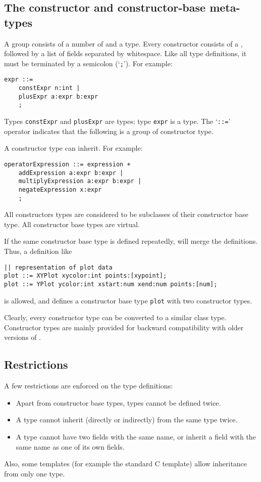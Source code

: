 \subsection{The constructor and constructor-base meta-types}
A  group consists of a number of 
and a  type.
Every constructor consists of a , followed by a 
list of fields separated by whitespace.
Like all type definitions, it must be terminated by a semicolon (`\verb';'').
For example:
\begin{verbatim}
expr ::=
    constExpr n:int |
    plusExpr a:expr b:expr
    ;
\end{verbatim}
Types {\tt constExpr} and {\tt plusExpr} are  types;
type {\tt expr} is a  type.
The `\verb'::='' operator indicates that the following is a group of
constructor type.
\par
A constructor type can inherit. For example:
\begin{verbatim}
operatorExpression ::= expression +
    addExpression a:expr b:expr |
    multiplyExpression a:expr b:expr |
    negateExpression x:expr
    ;
\end{verbatim}
All constructors types are considered to be subclasses of their
constructor base type. All constructor base types are virtual.
\par
If the same constructor base type is defined repeatedly, {\Tm} will merge the
definitions.
Thus, a definition like
\begin{verbatim}
|| representation of plot data
plot ::= XYPlot xycolor:int points:[xypoint];
plot ::= YPlot ycolor:int xstart:num xend:num points:[num];
\end{verbatim}
is allowed, and defines a constructor base type {\tt plot} with two
constructor types.
\par
Clearly, every constructor type can be converted to a similar class type.
Constructor types are mainly provided for backward compatibility with
older versions of {\Tm}.
\subsection{Restrictions}
A few restrictions are enforced on the type definitions:
\begin{itemize}
\item Apart from constructor base types, types cannot be defined twice.
\item A type cannot inherit (directly or indirectly) from the same type
twice.
\item A type cannot have two fields with the same name, or inherit
a field with the same name as one of its own fields.
\end{itemize}
\par
Also, some templates (for example the standard C template) allow inheritance
from only one type.
